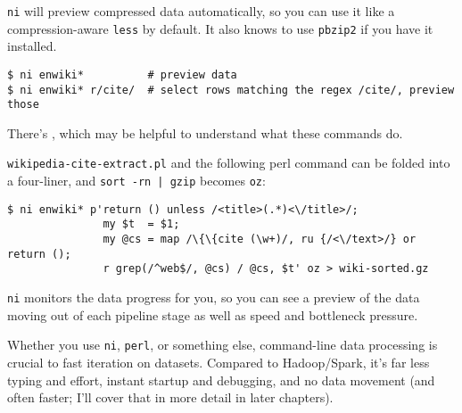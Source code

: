 {\tt ni} will preview compressed data automatically, so you can use it like a
compression-aware {\tt less} by default. It also knows to use {\tt pbzip2} if
you have it installed.

\begin{verbatim}
$ ni enwiki*          # preview data
$ ni enwiki* r/cite/  # select rows matching the regex /cite/, preview those \end{verbatim}

There's
, which may be helpful to understand what
these commands do.

{\tt wikipedia-cite-extract.pl} and the following perl command can be folded
into a four-liner, and \verb/sort -rn | gzip/ becomes {\tt oz}:

\begin{verbatim}
$ ni enwiki* p'return () unless /<title>(.*)<\/title>/;
               my $t  = $1;
               my @cs = map /\{\{cite (\w+)/, ru {/<\/text>/} or return ();
               r grep(/^web$/, @cs) / @cs, $t' oz > wiki-sorted.gz\end{verbatim}

{\tt ni} monitors the data progress for you, so you can see a preview of the
data moving out of each pipeline stage as well as speed and bottleneck pressure.

Whether you use {\tt ni}, {\tt perl}, or something else, command-line data
processing is crucial to fast iteration on datasets. Compared to Hadoop/Spark,
it's far less typing and effort, instant startup and debugging, and no data
movement (and often faster; I'll cover that in more detail in later chapters).

